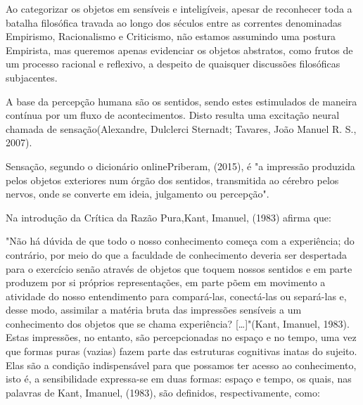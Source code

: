 Ao categorizar os objetos em sensíveis e inteligíveis, apesar de reconhecer toda a batalha filosófica travada ao longo dos séculos entre as correntes denominadas Empirismo, Racionalismo e Criticismo, não estamos assumindo uma postura Empirista, mas queremos apenas evidenciar os objetos abstratos, como frutos de um processo racional e reflexivo, a despeito de quaisquer discussões filosóficas subjacentes.

A base da percepção humana são os sentidos, sendo estes estimulados de maneira contínua por um fluxo de acontecimentos. Disto resulta uma excitação neural chamada de sensação(Alexandre, Dulclerci Sternadt; Tavares, João Manuel R. S., 2007).

Sensação, segundo o dicionário onlinePriberam, (2015), é "a impressão produzida pelos objetos exteriores num órgão dos sentidos, transmitida ao cérebro pelos nervos, onde se converte em ideia, julgamento ou percepção".

Na introdução da Crítica da Razão Pura,Kant, Imanuel, (1983) afirma que:

"Não há dúvida de que todo o nosso conhecimento começa com a experiência; do contrário, por meio do que a faculdade de conhecimento deveria ser despertada para o exercício senão através de objetos que toquem nossos sentidos e em parte produzem por si próprios representações, em parte põem em movimento a atividade do nosso entendimento para compará-las, conectá-las ou separá-las e, desse modo, assimilar a matéria bruta das impressões sensíveis a um conhecimento dos objetos que se chama experiência? […]"(Kant, Imanuel, 1983).
Estas impressões, no entanto, são percepcionadas no espaço e no tempo, uma vez que formas puras (vazias) fazem parte das estruturas cognitivas inatas do sujeito. Elas são a condição indispensável para que possamos ter acesso ao conhecimento, isto é, a sensibilidade expressa-se em duas formas: espaço e tempo, os quais, nas palavras de Kant, Imanuel, (1983), são definidos, respectivamente, como:


